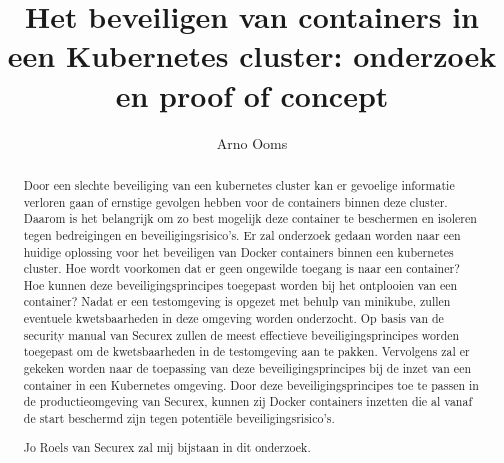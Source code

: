 \documentclass{hogent-article}
\title{Het beveiligen van containers in een Kubernetes cluster: onderzoek en proof of concept}
\author{Arno Ooms}
\begin{document}
    
    \begin{abstract}
        Door een slechte beveiliging van een kubernetes cluster kan er gevoelige informatie verloren gaan of ernstige gevolgen hebben voor de containers binnen deze cluster. Daarom is het belangrijk om zo best mogelijk deze container te beschermen en isoleren tegen bedreigingen en beveiligingsrisico's. Er zal onderzoek gedaan worden naar een huidige oplossing voor het beveiligen van Docker containers binnen een kubernetes cluster. Hoe wordt voorkomen dat er geen ongewilde toegang is naar een container? Hoe kunnen deze beveiligingsprincipes toegepast worden bij het ontplooien van een container? Nadat er een testomgeving is opgezet met behulp van minikube, zullen eventuele kwetsbaarheden in deze omgeving worden onderzocht. Op basis van de security manual van Securex zullen de meest effectieve beveiligingsprincipes worden toegepast om de kwetsbaarheden in de testomgeving aan te pakken. Vervolgens zal er gekeken worden naar de toepassing van deze beveiligingsprincipes bij de inzet van een container in een Kubernetes omgeving. Door deze beveiligingsprincipes toe te passen in de productieomgeving van Securex, kunnen zij Docker containers inzetten die al vanaf de start beschermd zijn tegen potentiële beveiligingsrisico's. 
        
        Jo Roels van Securex zal mij bijstaan in dit onderzoek.
    \end{abstract}
    
    \tableofcontents
    
    
    
    \printbibliography[heading=bibintoc]
    
\end{document}

